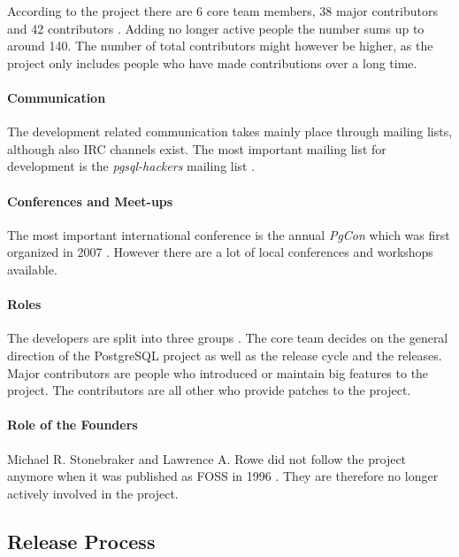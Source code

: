 According to the project there are 6 core team members, 38 major contributors
and 42 contributors \cite{PostgreSQLContributors}. Adding no longer active
people the number sums up to around 140. The number of total contributors
might however be higher, as the project only includes people who have made
contributions over a long time.

\paragraph{Communication}

The development related communication takes mainly place through mailing lists,
although also \ac{IRC} channels exist. The most important mailing list for
development is the \emph{pgsql-hackers} mailing list \cite{PostgreSQLDevFAQ}.

\paragraph{Conferences and Meet-ups}

The most important international conference is the annual \emph{PgCon} which
was first organized in 2007 \cite{PostgreSQLEvents}. However there are a lot of
local conferences and workshops available.

\paragraph{Roles}

The developers are split into three groups \cite{PostgreSQLContributors}. The
core team decides on the general direction of the PostgreSQL project as well as
the release cycle and the releases. Major contributors are people who
introduced or maintain big features to the project. The contributors are all
other who provide patches to the project.

\paragraph{Role of the Founders}

Michael R. Stonebraker and Lawrence A. Rowe did not follow the project anymore
when it was published as \ac{FOSS} in 1996 \cite{PostgreSQLHistory}. They are
therefore no longer actively involved in the project.

\subsection{Release Process}

